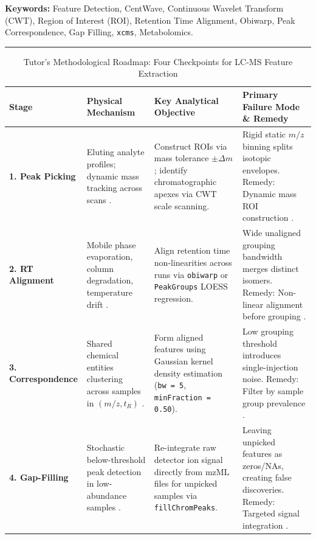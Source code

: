 \documentclass[11pt,twoside,openright]{book}
\begin{document}
\noindent\textbf{Keywords:} Feature Detection, CentWave, Continuous Wavelet Transform (CWT), Region of Interest (ROI), Retention Time Alignment, Obiwarp, Peak Correspondence, Gap Filling, \texttt{xcms}, Metabolomics.

\vspace{0.8em}
\noindent\rule{\textwidth}{0.4pt}


\begin{table}[ht]
\centering
\caption{Tutor's Methodological Roadmap: Four Checkpoints for LC-MS Feature Extraction}
\label{tab:feature_roadmap}
\small
\begin{tabularx}{\textwidth}{l p{3.8cm} p{4.2cm} X}
\toprule
\textbf{Stage} & \textbf{Physical Mechanism} & \textbf{Key Analytical Objective} & \textbf{Primary Failure Mode \& Remedy} \\
\midrule
\textbf{1. Peak Picking} & Eluting analyte profiles; dynamic mass tracking across scans \cite{smith2006xcms, tautenhahn2008highly}. & Construct ROIs via mass tolerance $\pm \Delta m$; identify chromatographic apexes via CWT scale scanning. & Rigid static $m/z$ binning splits isotopic envelopes. Remedy: Dynamic mass ROI construction \cite{pluskal2010mzmine}. \\
\addlinespace
\textbf{2. RT Alignment} & Mobile phase evaporation, column degradation, temperature drift \cite{prince2006chromatographic, mahieu2016warping}. & Align retention time non-linearities across runs via \texttt{obiwarp} or \texttt{PeakGroups} LOESS regression. & Wide unaligned grouping bandwidth merges distinct isomers. Remedy: Non-linear alignment before grouping \cite{mclean2021metabolomics}. \\
\addlinespace
\textbf{3. Correspondence} & Shared chemical entities clustering across samples in $(m/z, t_R)$ \cite{dunn2011mass, broadhurst2018guidelines}. & Form aligned features using Gaussian kernel density estimation (\texttt{bw = 5}, \texttt{minFraction = 0.50}). & Low grouping threshold introduces single-injection noise. Remedy: Filter by sample group prevalence \cite{rainer2022modular}. \\
\addlinespace
\textbf{4. Gap-Filling} & Stochastic below-threshold peak detection in low-abundance samples \cite{stanstrup2019toolbox, gieling2020assessment}. & Re-integrate raw detector ion signal directly from mzML files for unpicked samples via \texttt{fillChromPeaks}. & Leaving unpicked features as zeros/NAs, creating false discoveries. Remedy: Targeted signal integration \cite{benton2015evaluating}. \\
\bottomrule
\end{tabularx}
\end{table}
\end{document}
